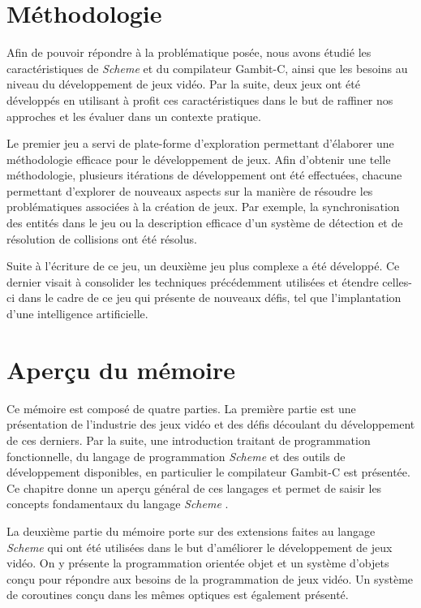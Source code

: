 \documentclass[12pt,twoside,letterpaper,francais]{book}
\newcommand{\Schemelang}{{\textit{Scheme }}}
\begin{document}
\FloatBarrier
\section{Méthodologie}
Afin de pouvoir répondre à la problématique posée, nous avons étudié
les caractéristiques de \Schemelang et du compilateur Gambit-C, ainsi
que les besoins au niveau du développement de jeux vidéo. Par la
suite, deux jeux ont été développés en utilisant à profit ces
caractéristiques dans le but de raffiner nos approches et les évaluer
dans un contexte pratique.

Le premier jeu a servi de plate-forme d'exploration permettant
d'élaborer une méthodologie efficace pour le développement de
jeux. Afin d'obtenir une telle méthodologie, plusieurs itérations de
développement ont été effectuées, chacune permettant d'explorer de
nouveaux aspects sur la manière de résoudre les problématiques
associées à la création de jeux. Par exemple, la synchronisation des
entités dans le jeu ou la description efficace d'un système de
détection et de résolution de collisions ont été résolus.

Suite à l'écriture de ce jeu, un deuxième jeu plus complexe a été
développé. Ce dernier visait à consolider les techniques précédemment
utilisées et étendre celles-ci dans le cadre de ce jeu qui présente de
nouveaux défis, tel que l'implantation d'une intelligence
artificielle.


\FloatBarrier
\section{Aperçu du mémoire}
Ce mémoire est composé de quatre parties. La première partie est une
présentation de l'industrie des jeux vidéo et des défis découlant du
développement de ces derniers. Par la suite, une introduction traitant
de programmation fonctionnelle, du langage de programmation
\Schemelang et des outils de développement disponibles, en particulier
le compilateur Gambit-C est présentée. Ce chapitre donne un aperçu
général de ces langages et permet de saisir les concepts fondamentaux
du langage \Schemelang.

La deuxième partie du mémoire porte sur des extensions faites au
langage \Schemelang qui ont été utilisées dans le but d'améliorer le
développement de jeux vidéo. On y présente la programmation orientée
objet et un système d'objets conçu pour répondre aux besoins de la
programmation de jeux vidéo. Un système de coroutines conçu dans les
mêmes optiques est également présenté.
\end{document}
